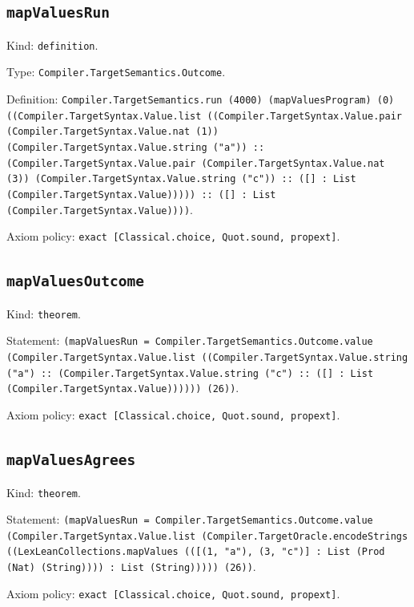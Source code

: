 \documentclass[11pt]{article}
\begin{document}
\subsection*{\texttt{mapValuesRun}}
\noindent Kind: \texttt{definition}.\par
\noindent Type: \texttt{Compiler.TargetSemantics.Outcome}.\par
\noindent Definition: \texttt{Compiler.TargetSemantics.run (4000) (mapValuesProgram) (0) ((Compiler.TargetSyntax.Value.list ((Compiler.TargetSyntax.Value.pair (Compiler.TargetSyntax.Value.nat (1)) (Compiler.TargetSyntax.Value.string ("a")) :: (Compiler.TargetSyntax.Value.pair (Compiler.TargetSyntax.Value.nat (3)) (Compiler.TargetSyntax.Value.string ("c")) :: ([] : List (Compiler.TargetSyntax.Value))))) :: ([] : List (Compiler.TargetSyntax.Value))))}.\par
\noindent Axiom policy: \texttt{exact [Classical.choice, Quot.sound, propext]}.\par
\subsection*{\texttt{mapValuesOutcome}}
\noindent Kind: \texttt{theorem}.\par
\noindent Statement: \texttt{(mapValuesRun = Compiler.TargetSemantics.Outcome.value (Compiler.TargetSyntax.Value.list ((Compiler.TargetSyntax.Value.string ("a") :: (Compiler.TargetSyntax.Value.string ("c") :: ([] : List (Compiler.TargetSyntax.Value)))))) (26))}.\par
\noindent Axiom policy: \texttt{exact [Classical.choice, Quot.sound, propext]}.\par
\subsection*{\texttt{mapValuesAgrees}}
\noindent Kind: \texttt{theorem}.\par
\noindent Statement: \texttt{(mapValuesRun = Compiler.TargetSemantics.Outcome.value (Compiler.TargetSyntax.Value.list (Compiler.TargetOracle.encodeStrings ((LexLeanCollections.mapValues (([(1, "a"), (3, "c")] : List (Prod (Nat) (String)))) : List (String))))) (26))}.\par
\noindent Axiom policy: \texttt{exact [Classical.choice, Quot.sound, propext]}.\par
\end{document}
